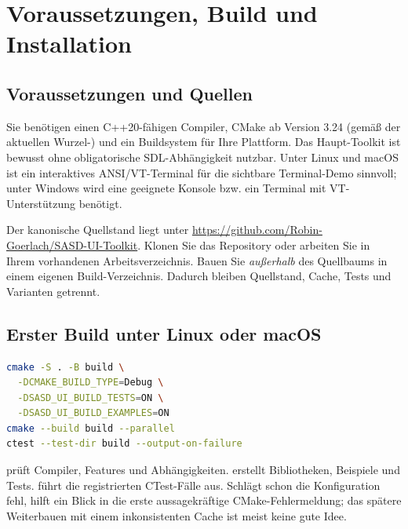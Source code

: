 \chapter{Voraussetzungen, Build und Installation}\label{chap:install}

\section{Voraussetzungen und Quellen}
Sie benötigen einen C++20-fähigen Compiler, CMake ab Version 3.24
(gemäß der aktuellen Wurzel-) und ein
Buildsystem für Ihre Plattform. Das Haupt-Toolkit ist bewusst ohne
obligatorische SDL-Abhängigkeit nutzbar. Unter Linux und macOS ist
ein interaktives ANSI/VT-Terminal für die sichtbare Terminal-Demo
sinnvoll; unter Windows wird eine geeignete Konsole bzw. ein
Terminal mit VT-Unterstützung benötigt.

Der kanonische Quellstand liegt unter
\url{https://github.com/Robin-Goerlach/SASD-UI-Toolkit}.
Klonen Sie das Repository oder arbeiten Sie in Ihrem vorhandenen
Arbeitsverzeichnis. Bauen Sie \emph{außerhalb} des Quellbaums in
einem eigenen Build-Verzeichnis. Dadurch bleiben Quellstand, Cache,
Tests und Varianten getrennt.

\section{Erster Build unter Linux oder macOS}
\begin{lstlisting}[language=bash,caption={Konfigurieren, bauen und testen}]
cmake -S . -B build \
  -DCMAKE_BUILD_TYPE=Debug \
  -DSASD_UI_BUILD_TESTS=ON \
  -DSASD_UI_BUILD_EXAMPLES=ON
cmake --build build --parallel
ctest --test-dir build --output-on-failure
\end{lstlisting}
\term{Konfigurieren} prüft Compiler, Features und Abhängigkeiten.
\term{Bauen} erstellt Bibliotheken, Beispiele und Tests.
\term{Testen} führt die registrierten CTest-Fälle aus.
Schlägt schon die Konfiguration fehl, hilft ein Blick in die erste
aussagekräftige CMake-Fehlermeldung; das spätere Weiterbauen mit
einem inkonsistenten Cache ist meist keine gute Idee.

